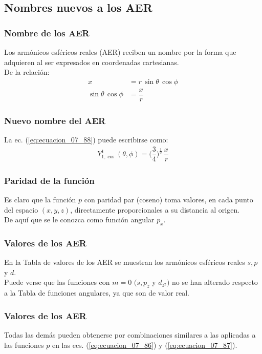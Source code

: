 \documentclass[12pt]{beamer}
\begin{document}
\subsection{Nombres nuevos a los AER}

\begin{frame}
\frametitle{Nombre de los AER}
Los armónicos esféricos reales (AER) reciben un nombre por la forma que adquieren al ser expresados en coordenadas cartesianas.
\\
\bigskip
\pause
De la relación:
\begin{align*}
x &= r \, \sin \theta \, \cos \phi \\[0.5em]
\sin \theta \, \cos \phi &= \dfrac{x}{r}
\end{align*}
\end{frame}
\begin{frame}
\frametitle{Nuevo nombre del AER}
La ec. (\ref{eq:ecuacion_07_88}) puede escribirse como:
\pause
\begin{align*}
Y_{1, \cos}^{1} (\theta, \phi) = \bigg( \dfrac{3}{4} \bigg)^{\frac{1}{2}} \, \dfrac{x}{r}
\end{align*}
\end{frame}    
\begin{frame}
\frametitle{Paridad de la función}
Es claro que la función $p$ con paridad par (coseno) toma valores, en cada punto del espacio $(x, y, z)$, directamente proporcionales a su distancia al origen.
\\
\bigskip
\pause
De aquí que se le conozca como función angular $p_{x}$.
\end{frame}
\begin{frame}
\frametitle{Valores de los AER}
En la Tabla de valores de los AER se muestran los armónicos esféricos reales $s, p$ y $d$. 
\\
\bigskip
\pause
Puede verse que las funciones con $m = 0$ $(s, p_{z}$ y $d_{z^{2}})$ no se han alterado respecto a la Tabla de funciones angulares, ya que son de valor real.
\end{frame}
\begin{frame}
\frametitle{Valores de los AER}
Todas las demás pueden obtenerse por combinaciones similares a las aplicadas a las funciones $p$ en las ecs. (\ref{eq:ecuacion_07_86}) y (\ref{eq:ecuacion_07_87}).
\end{frame}
\end{document}

